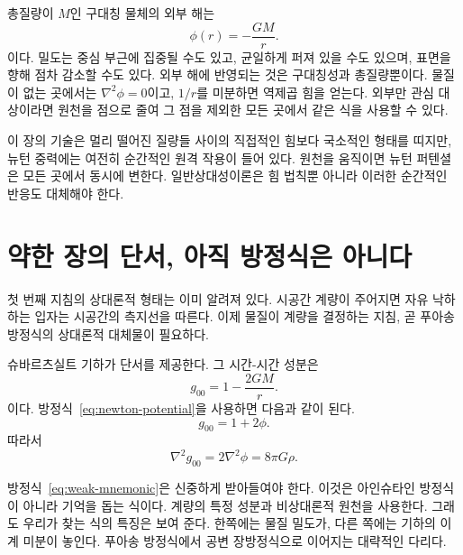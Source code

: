 총질량이 \(M\)인 구대칭 물체의 외부 해는
\begin{equation}
 \phi(r)=-\frac{GM}{r}.
 \label{eq:newton-potential}
\end{equation}
이다. 밀도는 중심 부근에 집중될 수도 있고, 균일하게 퍼져 있을 수도 있으며, 표면을 향해 점차 감소할 수도 있다. 외부 해에 반영되는 것은 구대칭성과 총질량뿐이다. 물질이 없는 곳에서는
\(\nabla^2\phi=0\)이고, \(1/r\)를 미분하면 역제곱 힘을 얻는다. 외부만 관심 대상이라면 원천을 점으로 줄여 그 점을 제외한 모든 곳에서 같은 식을 사용할 수 있다.

\begin{classroomqa}
\end{classroomqa}

이 장의 기술은 멀리 떨어진 질량들 사이의 직접적인 힘보다 국소적인 형태를 띠지만, 뉴턴 중력에는 여전히 순간적인 원격 작용이 들어 있다. 원천을 움직이면 뉴턴 퍼텐셜은 모든 곳에서 동시에 변한다. 일반상대성이론은 힘 법칙뿐 아니라 이러한 순간적인 반응도 대체해야 한다.

\section{약한 장의 단서, 아직 방정식은 아니다}

첫 번째 지침의 상대론적 형태는 이미 알려져 있다. 시공간 계량이 주어지면 자유 낙하하는 입자는 시공간의 측지선을 따른다. 이제 물질이 계량을 결정하는 지침, 곧 푸아송 방정식의 상대론적 대체물이 필요하다.

슈바르츠실트 기하가 단서를 제공한다. 그 시간-시간 성분은
\begin{equation}
 g_{00}=1-\frac{2GM}{r}.
\end{equation}
이다. 방정식~\eqref{eq:newton-potential}을 사용하면 다음과 같이 된다.
\begin{equation}
 g_{00}=1+2\phi.
\end{equation}
따라서
\begin{equation}
 \nabla^2g_{00}=2\nabla^2\phi=8\pi G\rho.
 \label{eq:weak-mnemonic}
\end{equation}

방정식~\eqref{eq:weak-mnemonic}은 신중하게 받아들여야 한다. 이것은 아인슈타인 방정식이 아니라 기억을 돕는 식이다. 계량의 특정 성분과 비상대론적 원천을 사용한다. 그래도 우리가 찾는 식의 특징은 보여 준다. 한쪽에는 물질 밀도가, 다른 쪽에는 기하의 이계 미분이 놓인다. 푸아송 방정식에서 공변 장방정식으로 이어지는 대략적인 다리다.

